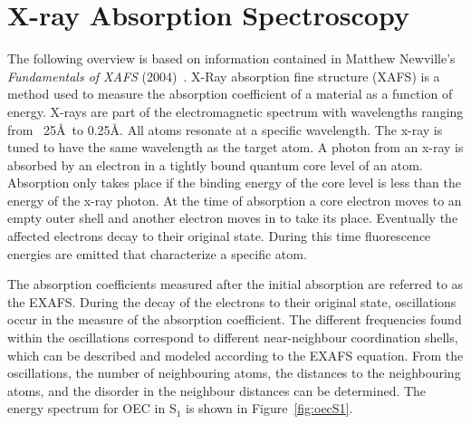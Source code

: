 \section{X-ray Absorption Spectroscopy}

The following overview is based on information contained in Matthew Newville's \textit{Fundamentals of XAFS} (2004)~\cite{newville2004fundamentals}. X-Ray absorption fine structure (XAFS) is a method used to measure the absorption coefficient of a material as a function of energy. X-rays are part of the electromagnetic spectrum with wavelengths ranging from ~25\AA\ to 0.25\AA. All atoms resonate at a specific wavelength. The x-ray is tuned to have the same wavelength as the target atom. A photon from an x-ray is absorbed by an electron in a tightly bound quantum core level of an atom. Absorption only takes place if the binding energy of the core level is less than the energy of the x-ray photon. At the time of absorption a core electron moves to an empty outer shell and another electron moves in to take its place. Eventually the affected electrons decay to their original state. During this time fluorescence energies are emitted that characterize a specific atom.

The absorption coefficients measured after the initial absorption are referred to as the EXAFS. During the decay of the electrons to their original state, oscillations occur in the measure of the absorption coefficient. The different frequencies found within the oscillations correspond to different near-neighbour coordination shells, which can be described and modeled according to the EXAFS equation. From the oscillations, the number of neighbouring atoms, the distances to the neighbouring atoms, and the disorder in the neighbour distances can be determined. The energy spectrum for OEC in S$_{1}$ is shown in Figure~\ref{fig:oecS1}.

\begin{figure*}
	\caption{EXAFS Spectra of OEC in S$_{1}$}
	\label{fig:oecS1}
\end{figure*}